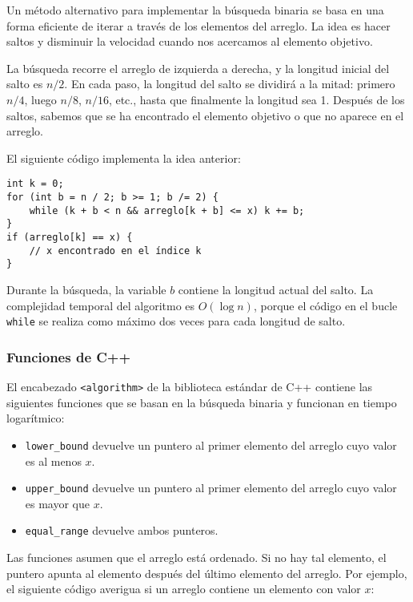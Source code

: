 Un método alternativo para implementar la búsqueda binaria
se basa en una forma eficiente de iterar a través de
los elementos del arreglo.
La idea es hacer saltos y disminuir la velocidad
cuando nos acercamos al elemento objetivo.

La búsqueda recorre el arreglo de izquierda a
derecha, y la longitud inicial del salto es $n/2$.
En cada paso, la longitud del salto se dividirá a la mitad:
primero $n/4$, luego $n/8$, $n/16$, etc., hasta
que finalmente la longitud sea 1.
Después de los saltos, sabemos que se ha encontrado el elemento
objetivo o que no aparece en el arreglo.

\newpage
El siguiente código implementa la idea anterior:
\begin{lstlisting}
int k = 0;
for (int b = n / 2; b >= 1; b /= 2) {
    while (k + b < n && arreglo[k + b] <= x) k += b;
}
if (arreglo[k] == x) {
    // x encontrado en el índice k
}
\end{lstlisting}

Durante la búsqueda, la variable $b$
contiene la longitud actual del salto.
La complejidad temporal del algoritmo es $O(\log n)$,
porque el código en el bucle \texttt{while}
se realiza como máximo dos veces para cada longitud de salto.

\subsubsection{Funciones de C++}

El encabezado \texttt{<algorithm>} de la biblioteca estándar
de C++ contiene las siguientes funciones
que se basan en la búsqueda binaria y funcionan en tiempo logarítmico:

\begin{itemize}
    \item \texttt{lower\_bound} devuelve un puntero al
          primer elemento del arreglo cuyo valor es al menos $x$.
    \item \texttt{upper\_bound} devuelve un puntero al
          primer elemento del arreglo cuyo valor es mayor que $x$.
    \item \texttt{equal\_range} devuelve ambos punteros.
\end{itemize}

Las funciones asumen que el arreglo está ordenado.
Si no hay tal elemento, el puntero apunta al
elemento después del último elemento del arreglo.
Por ejemplo, el siguiente código averigua si
un arreglo contiene un elemento con valor $x$:

